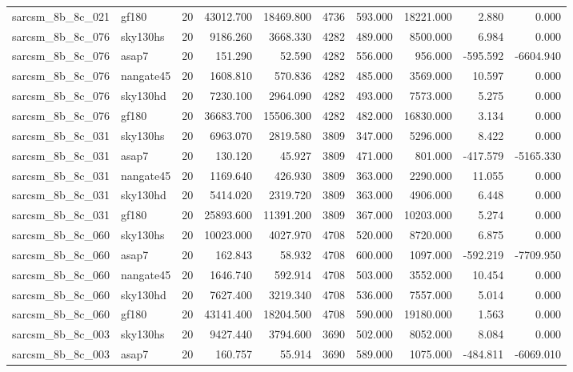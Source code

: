 \documentclass{article}
\begin{document}
\begin{longtable}{llrrrrrrrr}
sarcsm\_8b\_8c\_021 & gf180 & 20 & 43012.700 & 18469.800 & 4736 & 593.000 & 18221.000 & 2.880 & 0.000 \\
sarcsm\_8b\_8c\_076 & sky130hs & 20 & 9186.260 & 3668.330 & 4282 & 489.000 & 8500.000 & 6.984 & 0.000 \\
sarcsm\_8b\_8c\_076 & asap7 & 20 & 151.290 & 52.590 & 4282 & 556.000 & 956.000 & -595.592 & -6604.940 \\
sarcsm\_8b\_8c\_076 & nangate45 & 20 & 1608.810 & 570.836 & 4282 & 485.000 & 3569.000 & 10.597 & 0.000 \\
sarcsm\_8b\_8c\_076 & sky130hd & 20 & 7230.100 & 2964.090 & 4282 & 493.000 & 7573.000 & 5.275 & 0.000 \\
sarcsm\_8b\_8c\_076 & gf180 & 20 & 36683.700 & 15506.300 & 4282 & 482.000 & 16830.000 & 3.134 & 0.000 \\
sarcsm\_8b\_8c\_031 & sky130hs & 20 & 6963.070 & 2819.580 & 3809 & 347.000 & 5296.000 & 8.422 & 0.000 \\
sarcsm\_8b\_8c\_031 & asap7 & 20 & 130.120 & 45.927 & 3809 & 471.000 & 801.000 & -417.579 & -5165.330 \\
sarcsm\_8b\_8c\_031 & nangate45 & 20 & 1169.640 & 426.930 & 3809 & 363.000 & 2290.000 & 11.055 & 0.000 \\
sarcsm\_8b\_8c\_031 & sky130hd & 20 & 5414.020 & 2319.720 & 3809 & 363.000 & 4906.000 & 6.448 & 0.000 \\
sarcsm\_8b\_8c\_031 & gf180 & 20 & 25893.600 & 11391.200 & 3809 & 367.000 & 10203.000 & 5.274 & 0.000 \\
sarcsm\_8b\_8c\_060 & sky130hs & 20 & 10023.000 & 4027.970 & 4708 & 520.000 & 8720.000 & 6.875 & 0.000 \\
sarcsm\_8b\_8c\_060 & asap7 & 20 & 162.843 & 58.932 & 4708 & 600.000 & 1097.000 & -592.219 & -7709.950 \\
sarcsm\_8b\_8c\_060 & nangate45 & 20 & 1646.740 & 592.914 & 4708 & 503.000 & 3552.000 & 10.454 & 0.000 \\
sarcsm\_8b\_8c\_060 & sky130hd & 20 & 7627.400 & 3219.340 & 4708 & 536.000 & 7557.000 & 5.014 & 0.000 \\
sarcsm\_8b\_8c\_060 & gf180 & 20 & 43141.400 & 18204.500 & 4708 & 590.000 & 19180.000 & 1.563 & 0.000 \\
sarcsm\_8b\_8c\_003 & sky130hs & 20 & 9427.440 & 3794.600 & 3690 & 502.000 & 8052.000 & 8.084 & 0.000 \\
sarcsm\_8b\_8c\_003 & asap7 & 20 & 160.757 & 55.914 & 3690 & 589.000 & 1075.000 & -484.811 & -6069.010 \\

\end{longtable}
\end{document}

